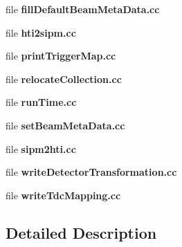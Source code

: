 \begin{DoxyCompactItemize}
\item 
file {\bf fill\-Default\-Beam\-Meta\-Data.\-cc}
\item 
file {\bf hti2sipm.\-cc}
\item 
file {\bf print\-Trigger\-Map.\-cc}
\item 
file {\bf relocate\-Collection.\-cc}
\item 
file {\bf run\-Time.\-cc}
\item 
file {\bf set\-Beam\-Meta\-Data.\-cc}
\item 
file {\bf sipm2hti.\-cc}
\item 
file {\bf write\-Detector\-Transformation.\-cc}
\item 
file {\bf write\-Tdc\-Mapping.\-cc}
\end{DoxyCompactItemize}


\subsection{Detailed Description}
\label{group__tools_exec_doc}%
